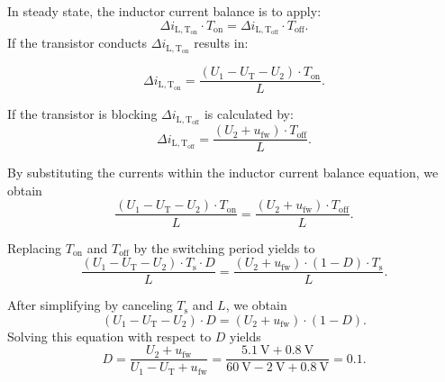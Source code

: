 \begin{solutionblock}
	In steady state, the inductor current balance is to apply:
	\begin{equation*}
		\Delta i_\mathrm{L,T_\mathrm{on}} \cdot T_\mathrm{on}=\Delta i_\mathrm{L,T_\mathrm{off}} \cdot T_\mathrm{off}.
	\end{equation*}
	If the transistor conducts $\Delta i_\mathrm{L,T_\mathrm{on}}$ results in:

	\begin{equation*}
		\Delta i_\mathrm{L,T_\mathrm{on}}=\frac{(U_\mathrm{1}-U_\mathrm{T}-U_\mathrm{2}) \cdot T_\mathrm{on} }{L}.
	\end{equation*}

	If the transistor is blocking $\Delta i_\mathrm{L,T_\mathrm{off}}$ is calculated by:
	\begin{equation*}
		\Delta i_\mathrm{L,T_\mathrm{off}}=\frac{(U_\mathrm{2}+u_\mathrm{fw}) \cdot T_\mathrm{off}}{L}.
	\end{equation*}

	By substituting the currents within the inductor current balance equation, we obtain
	\begin{equation*}
		\frac{(U_\mathrm{1}-U_\mathrm{T}-U_\mathrm{2}) \cdot T_\mathrm{on}}{L}=\frac{(U_\mathrm{2}+u_\mathrm{fw}) \cdot T_\mathrm{off}}{L}.
	\end{equation*}

	Replacing $T_\mathrm{on}$ and $T_\mathrm{off}$ by the switching period yields to
	\begin{equation*}
		\frac{(U_\mathrm{1}-U_\mathrm{T}-U_\mathrm{2}) \cdot T_\mathrm{s} \cdot D}{L} =
		\frac{(U_\mathrm{2}+u_\mathrm{fw}) \cdot (1-D) \cdot T_\mathrm{s}}{L}.
	\end{equation*}

	After simplifying by canceling $T_\mathrm{s}$ and $L$, we obtain
	\begin{equation*}
		(U_\mathrm{1}-U_\mathrm{T}-U_\mathrm{2}) \cdot D =
		(U_\mathrm{2}+u_\mathrm{fw}) \cdot (1-D).
	\end{equation*}
	Solving this equation with respect to $D$ yields
	\begin{equation*}
		D = \frac{U_\mathrm{2}+u_\mathrm{fw}}{U_\mathrm{1}-U_\mathrm{T}+u_\mathrm{fw}} =
		\frac{\SI{5.1}{\volt}+\SI{0.8}{\volt}}{\SI{60}{\volt} - \SI{2}{\volt}+\SI{0.8}{\volt}}  = 0.1.
	\end{equation*}

\end{solutionblock}

